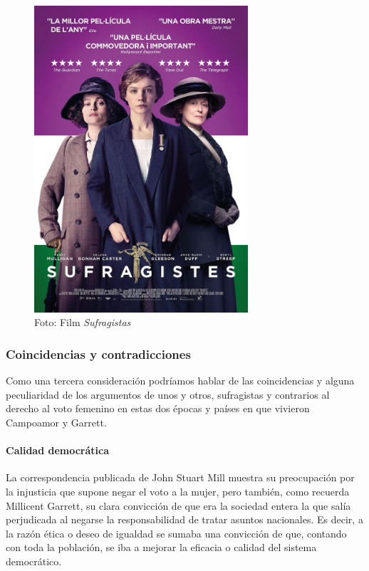 \documentclass[
]{article}
\begin{document}
\begin{figure}
\centering
\includegraphics[width=3.125in,height=\textheight]{png/Sufragistes.jpg}
\caption{Foto: Film \emph{Sufragistas}}
\end{figure}

\hypertarget{coincidencias-y-contradicciones}{%
\subsubsection{Coincidencias y
contradicciones}\label{coincidencias-y-contradicciones}}

Como una tercera consideración podríamos hablar de las coincidencias y
alguna peculiaridad de los argumentos de unos y otros, sufragistas y
contrarios al derecho al voto femenino en estas dos épocas y países en
que vivieron Campoamor y Garrett.

\hypertarget{calidad-democruxe1tica}{%
\paragraph{Calidad democrática}\label{calidad-democruxe1tica}}

La correspondencia publicada de John Stuart Mill muestra su preocupación
por la injusticia que supone negar el voto a la mujer, pero también,
como recuerda Millicent Garrett, su clara convicción de que era la
sociedad entera la que salía perjudicada al negarse la responsabilidad
de tratar asuntos nacionales. Es decir, a la razón ética o deseo de
igualdad se sumaba una convicción de que, contando con toda la
población, se iba a mejorar la eficacia o calidad del sistema
democrático.
\end{document}
